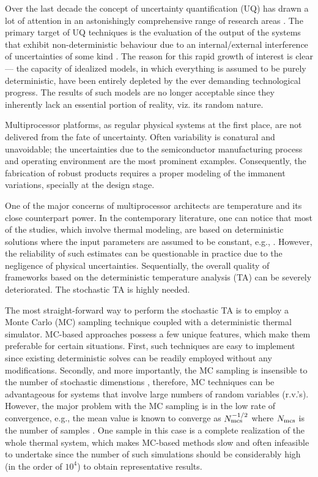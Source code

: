 Over the last decade the concept of uncertainty quantification (UQ) has drawn a lot of attention in an astonishingly comprehensive range of research areas \cite{xiu2009}. The primary target of UQ techniques is the evaluation of the output of the systems that exhibit non-deterministic behaviour due to an internal/external interference of uncertainties of some kind \cite{eldred2009}. The reason for this rapid growth of interest is clear --- the capacity of idealized models, in which everything is assumed to be purely deterministic, have been entirely depleted by the ever demanding technological progress. The results of such models are no longer acceptable since they inherently lack an essential portion of reality, viz. its random nature.

Multiprocessor platforms, as regular physical systems at the first place, are not delivered from the fate of uncertainty. Often variability is conatural and unavoidable; the uncertainties due to the semiconductor manufacturing process and operating environment are the most prominent examples. Consequently, the fabrication of robust products requires a proper modeling of the immanent variations, specially at the design stage.

One of the major concerns of multiprocessor architects are temperature and its close counterpart power. In the contemporary literature, one can notice that most of the studies, which involve thermal modeling, are based on deterministic solutions where the input parameters are assumed to be constant, e.g., \cite{ukhov2012}. However, the reliability of such estimates can be questionable in practice due to the negligence of physical uncertainties. Sequentially, the overall quality of frameworks based on the deterministic temperature analysis (TA) can be severely deteriorated. The stochastic TA is highly needed.

The most straight-forward way to perform the stochastic TA is to employ a Monte Carlo (MC) sampling technique coupled with a deterministic thermal simulator. MC-based approaches possess a few unique features, which make them preferable for certain situations. First, such techniques are easy to implement since existing deterministic solves can be readily employed without any modifications. Secondly, and more importantly, the MC sampling is insensible to the number of stochastic dimenstions \cite{maitre2010}, therefore, MC techniques can be advantageous for systems that involve large numbers of random variables (r.v.'s). However, the major problem with the MC sampling is in the low rate of convergence, e.g., the mean value is known to converge as $N_\text{mcs}^{-{{1}/{2}}}$ where $N_\text{mcs}$ is the number of samples \cite{xiu2009, maitre2010}. One sample in this case is a complete realization of the whole thermal system, which makes MC-based methods slow and often infeasible to undertake since the number of such simulations should be considerably high (in the order of $10^4$) to obtain representative results.

